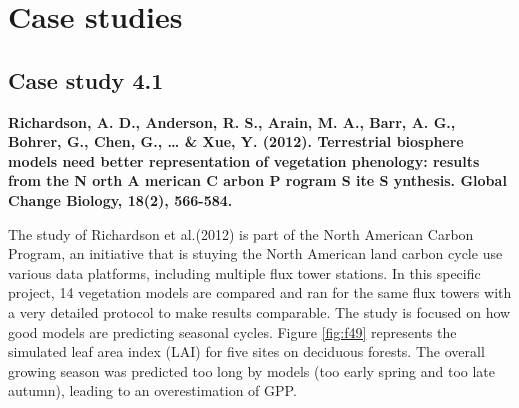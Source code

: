 \documentclass[
  12pt,
  oneside]{book}
\begin{document}
\hypertarget{case-studies-2}{%
\section{Case studies}\label{case-studies-2}}

\hypertarget{case-study-4.1}{%
\subsection{Case study 4.1}\label{case-study-4.1}}

\textbf{Richardson, A. D., Anderson, R. S., Arain, M. A., Barr, A. G., Bohrer, G., Chen, G., \ldots{} \& Xue, Y. (2012). Terrestrial biosphere models need better representation of vegetation phenology: results from the N orth A merican C arbon P rogram S ite S ynthesis. Global Change Biology, 18(2), 566-584.}

The study of Richardson et al.(2012) is part of the North American Carbon Program, an initiative that is stuying the North American land carbon cycle use various data platforms, including multiple flux tower stations. In this specific project, 14 vegetation models are compared and ran for the same flux towers with a very detailed protocol to make results comparable. The study is focused on how good models are predicting seasonal cycles. Figure \ref{fig:f49} represents the simulated leaf area index (LAI) for five sites on deciduous forests. The overall growing season was predicted too long by models (too early spring and too late autumn), leading to an overestimation of GPP.
\end{document}
